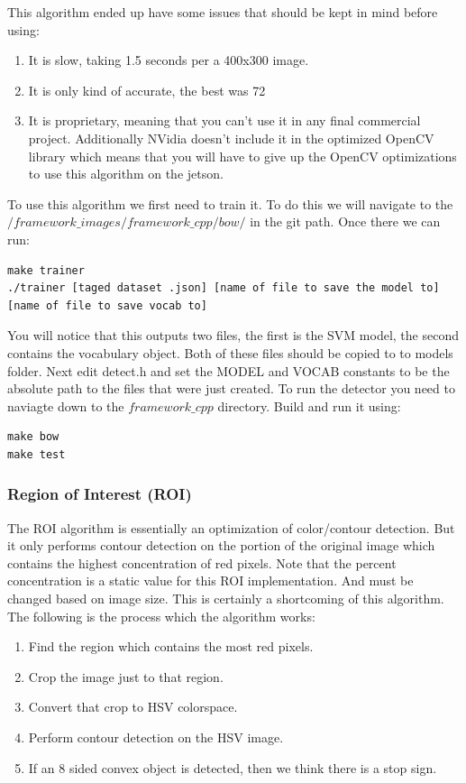 \documentclass[letterpaper,10pt,titlepage]{article}
\begin{document}
This algorithm ended up have some issues that should be kept in mind before using:
\begin{enumerate}
    \item It is slow, taking 1.5 seconds per a 400x300 image.
    \item It is only kind of accurate, the best was 72%
    \item It is proprietary, meaning that you can't use it in any final commercial project.
        Additionally NVidia doesn't include it in the optimized OpenCV library
        which means that you will have to give up the OpenCV optimizations
        to use this algorithm on the jetson.
\end{enumerate}

To use this algorithm we first need to train it. To do this we will navigate to the
$/framework\_images/framework\_cpp/bow/$ in the git path. Once there we can run:
\begin{lstlisting}
make trainer
./trainer [taged dataset .json] [name of file to save the model to] [name of file to save vocab to]
\end{lstlisting}

You will notice that this outputs two files, the first is the SVM model, the second 
contains the vocabulary object. Both of these files should be copied to to models 
folder. Next edit detect.h and set the MODEL and VOCAB constants to be the absolute
path to the files that were just created. To run the detector you need to naviagte 
down to the $framework\_cpp$ directory. Build and run it using:
\begin{lstlisting}
make bow
make test
\end{lstlisting}

\subsubsection*{Region of Interest (ROI)}

The ROI algorithm is essentially an optimization of color/contour detection. 
But it only performs contour detection on the portion of the original image which
contains the highest concentration of red pixels. Note that the percent concentration is a static value for this ROI implementation. And must be changed based on image size.
This is certainly a shortcoming of this algorithm.
The following is the process which the algorithm works:
\begin{enumerate}
    \item Find the region which contains the most red pixels.
    \item Crop the image just to that region.
    \item Convert that crop to HSV colorspace.
    \item Perform contour detection on the HSV image.
    \item If an 8 sided convex object is detected, then we think there is a stop sign.
\end{enumerate}
\end{document}

